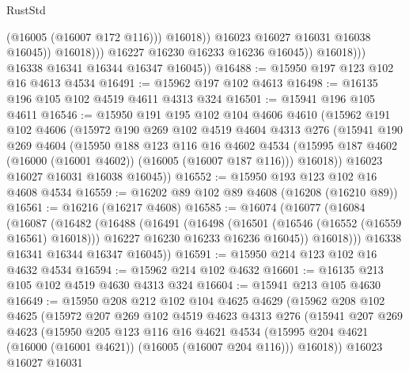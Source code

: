 \begin{lexlean}{RustStd}
\begin{coremodule}
                                  (@16005 (@16007 @172 @116)))
                                @16018))
                            @16023
                            @16027
                            @16031
                            @16038
                            @16045))
                        @16018)))
                  @16227
                  @16230
                  @16233
                  @16236
                  @16045))
              @16018)))
        @16338
        @16341
        @16344
        @16347
        @16045))
@16488 := @15950 @197 @123 @102 @16 @4613 @4534
@16491 := @15962 @197 @102 @4613
@16498 := @16135 @196 @105 @102 @4519 @4611 @4313 @324
@16501 := @15941 @196 @105 @4611
@16546 := @15950
    @191
    @195
    @102
    @104
    @4606
    @4610
    (@15962
      @191
      @102
      @4606
      (@15972
        @190
        @269
        @102
        @4519
        @4604
        @4313
        @276
        (@15941
          @190
          @269
          @4604
          (@15950
            @188
            @123
            @116
            @16
            @4602
            @4534
            (@15995 @187 @4602 (@16000 (@16001 @4602)) (@16005 (@16007 @187 @116)))
            @16018))
        @16023
        @16027
        @16031
        @16038
        @16045))
@16552 := @15950 @193 @123 @102 @16 @4608 @4534
@16559 := @16202 @89 @102 @89 @4608 (@16208 (@16210 @89))
@16561 := @16216 (@16217 @4608)
@16585 := @16074
    (@16077
      (@16084
        (@16087
          (@16482
            (@16488
              (@16491
                (@16498
                  (@16501 (@16546 (@16552 (@16559 @16561) @16018)))
                  @16227
                  @16230
                  @16233
                  @16236
                  @16045))
              @16018)))
        @16338
        @16341
        @16344
        @16347
        @16045))
@16591 := @15950 @214 @123 @102 @16 @4632 @4534
@16594 := @15962 @214 @102 @4632
@16601 := @16135 @213 @105 @102 @4519 @4630 @4313 @324
@16604 := @15941 @213 @105 @4630
@16649 := @15950
    @208
    @212
    @102
    @104
    @4625
    @4629
    (@15962
      @208
      @102
      @4625
      (@15972
        @207
        @269
        @102
        @4519
        @4623
        @4313
        @276
        (@15941
          @207
          @269
          @4623
          (@15950
            @205
            @123
            @116
            @16
            @4621
            @4534
            (@15995 @204 @4621 (@16000 (@16001 @4621)) (@16005 (@16007 @204 @116)))
            @16018))
        @16023
        @16027
        @16031

\end{coremodule}
\end{lexlean}
